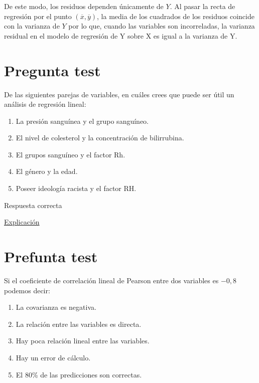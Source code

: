 \documentclass[
]{book}
\providecommand{\tightlist}{%
  \setlength{\itemsep}{0pt}\setlength{\parskip}{0pt}}
\begin{document}
De este modo, los residuos dependen únicamente de \(Y\). Al pasar la recta de regresión por el punto \((\overline{x}, \overline{y})\), la media de los cuadrados de los residuos coincide con la varianza de \(Y\) por lo que, cuando las variables son incorreladas, la varianza residual en el modelo de regresión de Y sobre X es igual a la varianza de Y.

\hypertarget{pregunta-test-114}{%
\section{Pregunta test}\label{pregunta-test-114}}

De las siguientes parejas de variables, en cuáles crees que puede ser útil un análisis de regresión lineal:

\begin{enumerate}
\def\labelenumi{\alph{enumi})}
\tightlist
\item
  La presión sanguínea y el grupo sanguíneo.
\item
  El nivel de colesterol y la concentración de bilirrubina.
\item
  El grupos sanguíneo y el factor Rh.
\item
  El género y la edad.
\item
  Poseer ideología racista y el factor RH.
\end{enumerate}

Respuesta correcta

\href{https://smiba.org.ar/curso_medico_especialista/lecturas_2021/e\%29.\%204\%20Correlación\%20y\%20regresión.pdf}{Explicación}

\hypertarget{prefunta-test}{%
\section{Prefunta test}\label{prefunta-test}}

Si el coeficiente de correlación lineal de Pearson entre dos variables es \(-0,8\) podemos decir:

\begin{enumerate}
\def\labelenumi{\alph{enumi})}
\tightlist
\item
  La covarianza es negativa.
\item
  La relación entre las variables es directa.
\item
  Hay poca relación lineal entre las variables.
\item
  Hay un error de cálculo.
\item
  El 80\% de las predicciones son correctas.
\end{enumerate}
\end{document}
